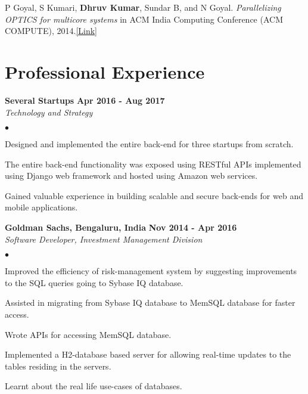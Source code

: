 \documentclass[margin,line]{res}
\newenvironment{list2}{
  \begin{list}{$\bullet$}{%
      \setlength{\itemsep}{0in}
      \setlength{\parsep}{0in} \setlength{\parskip}{0in}
      \setlength{\topsep}{0in} \setlength{\partopsep}{0in} 
      \setlength{\leftmargin}{0.2in}}}{\end{list}}
\begin{document}
\begin{resume}
P Goyal, S Kumari, {\bf Dhruv Kumar}, Sundar B, and N Goyal.
{\it Parallelizing OPTICS for multicore systems} in ACM India Computing
Conference (ACM COMPUTE), 2014.\href{http://dl.acm.org/citation.cfm?id=2675763}{\color{blue}[Link]}

\section{\sc Professional Experience}



{\bf Several Startups} \hfill {\bf Apr 2016 - Aug 2017}\\
{\em Technology and Strategy}
\vspace{.3cm}
\begin{list2}
\item Designed and implemented the entire back-end for three startups from scratch.
\item The entire back-end functionality was exposed using RESTful APIs implemented using Django web framework and hosted using Amazon web services.
\item Gained valuable experience in building scalable and secure back-ends for web and mobile applications.
\end{list2}

{\bf Goldman Sachs, Bengaluru, India} \hfill {\bf Nov 2014 - Apr 2016}\\
{\em Software Developer, Investment Management Division}
\vspace{.3cm}
\begin{list2}
\item Improved the efficiency of risk-management system by suggesting improvements to the SQL
queries going to Sybase IQ database.
\item Assisted in migrating from Sybase IQ database to MemSQL database for faster access.
\item Wrote APIs for accessing MemSQL database.
\item Implemented a H2-database based server for allowing real-time updates to the tables residing in
the servers.
\item Learnt about the real life use-cases of databases.
\end{list2}


\end{resume}
\end{document}
